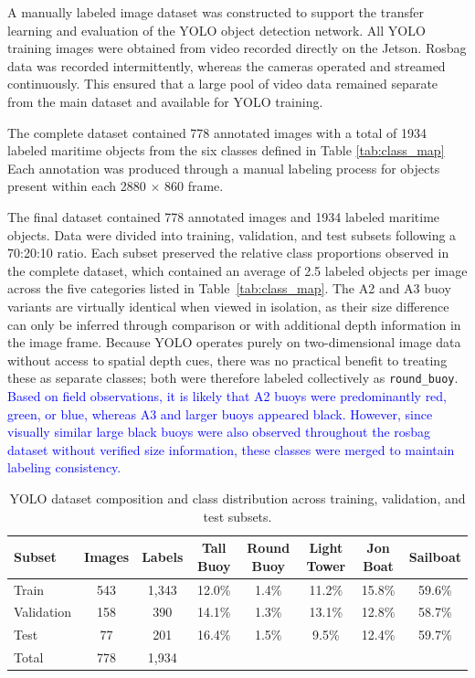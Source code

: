 \documentclass{erauthesis}
\begin{document}
A manually labeled image dataset was constructed to support the transfer learning and evaluation of the YOLO object detection network. 
All YOLO training images were obtained from video recorded directly on the Jetson.
Rosbag data was recorded intermittently, whereas the cameras operated and streamed continuously.
This ensured that a large pool of video data remained separate from the main dataset and available for YOLO training.

The complete dataset contained 778 annotated images with a total of 1934 labeled maritime objects from the six classes defined in Table \ref{tab:class_map} 
Each annotation was produced through a manual labeling process for objects present within each 2880 $\times$ 860 frame. 

The final dataset contained 778 annotated images and 1934 labeled maritime objects. 
Data were divided into training, validation, and test subsets following a 70:20:10 ratio.
Each subset preserved the relative class proportions observed in the complete dataset, which contained an average of 2.5 labeled objects per image across the five categories listed in Table~\ref{tab:class_map}.
The A2 and A3 buoy variants are virtually identical when viewed in isolation, as their size difference can only be inferred through comparison or with additional depth information in the image frame. 
Because YOLO operates purely on two-dimensional image data without access to spatial depth cues, there was no practical benefit to treating these as separate classes; both were therefore labeled collectively as \texttt{round\_buoy}.
\textcolor{blue}{Based on field observations, it is likely that A2 buoys were predominantly red, green, or blue, whereas A3 and larger buoys appeared black. 
However, since visually similar large black buoys were also observed throughout the rosbag dataset without verified size information, these classes were merged to maintain labeling consistency.}

\begin{table}[htbp]
\centering
\begin{tabular}{lccccccc}
\hline
Subset & Images & Labels & Tall Buoy & Round Buoy & Light Tower & Jon Boat & Sailboat \\
\hline
Train & 543 & 1,343 & 12.0\% & 1.4\% & 11.2\% & 15.8\% & 59.6\% \\
Validation & 158 & 390 & 14.1\% & 1.3\% & 13.1\% & 12.8\% & 58.7\% \\
Test & 77 & 201 & 16.4\% & 1.5\% & 9.5\% & 12.4\% & 59.7\% \\
\hline
Total & 778 & 1,934 &  &  &  &  &  \\
\hline
\end{tabular}
\caption{YOLO dataset composition and class distribution across training, validation, and test subsets.}
\label{table:yolo_data_split}
\end{table}
\end{document}
